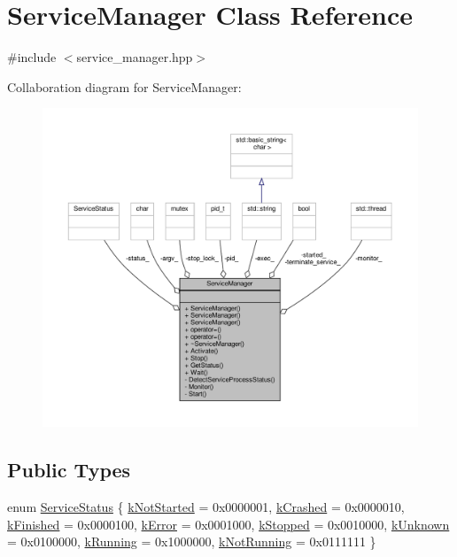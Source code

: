 \hypertarget{classServiceManager}{}\section{Service\+Manager Class Reference}
\label{classServiceManager}


{\ttfamily \#include $<$service\+\_\+manager.\+hpp$>$}



Collaboration diagram for Service\+Manager\+:
\nopagebreak
\begin{figure}[H]
\begin{center}
\leavevmode
\includegraphics[width=350pt]{classServiceManager__coll__graph}
\end{center}
\end{figure}
\subsection*{Public Types}
\begin{DoxyCompactItemize}
\item 
enum \hyperlink{classServiceManager_af3f2b1502eece536d0e4c8d3f2fa439d}{Service\+Status} \{ \newline
\hyperlink{classServiceManager_af3f2b1502eece536d0e4c8d3f2fa439dadd4504955ac55b144c5fdf12b65179e1}{k\+Not\+Started} = 0x0000001, 
\hyperlink{classServiceManager_af3f2b1502eece536d0e4c8d3f2fa439da40901bd157ecf07cb515fcbfec306e84}{k\+Crashed} = 0x0000010, 
\hyperlink{classServiceManager_af3f2b1502eece536d0e4c8d3f2fa439da06d50d83c0691750fb6b54e9d1debcbb}{k\+Finished} = 0x0000100, 
\hyperlink{classServiceManager_af3f2b1502eece536d0e4c8d3f2fa439daddfb67b5e8accfec993a510fc05caf19}{k\+Error} = 0x0001000, 
\newline
\hyperlink{classServiceManager_af3f2b1502eece536d0e4c8d3f2fa439da943a3d372a245eee2187752a0839fe9b}{k\+Stopped} = 0x0010000, 
\hyperlink{classServiceManager_af3f2b1502eece536d0e4c8d3f2fa439da512a4f5c6cc9932a1e0e9671e7115053}{k\+Unknown} = 0x0100000, 
\hyperlink{classServiceManager_af3f2b1502eece536d0e4c8d3f2fa439dad037ce7756a4242effb9c9479f9587b7}{k\+Running} = 0x1000000, 
\hyperlink{classServiceManager_af3f2b1502eece536d0e4c8d3f2fa439da02aea9725751e0dfb89711770ccd35e5}{k\+Not\+Running} = 0x0111111
 \}
\end{DoxyCompactItemize}
